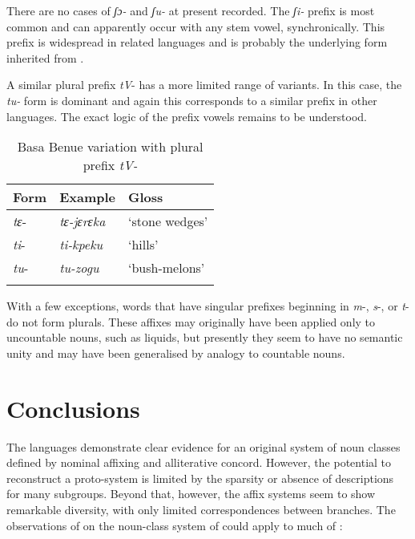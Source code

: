 \documentclass[output=paper]{langsci/langscibook}
\begin{document}
There are no cases of \textit{ʃɔ-} and \textit{ʃu-} at present recorded. The \textit{ʃi-} prefix is most common and can apparently occur with any stem vowel, synchronically. This prefix is widespread in related languages and is probably the underlying form inherited from . 

A similar plural prefix \textit{tV}- has a more limited range of variants. In this case, the \textit{tu-} form is dominant and again this corresponds to a similar prefix in other languages. The exact logic of the prefix vowels remains to be understood.

\begin{table}
\label{extab:kainji:8}
 \caption{Basa Benue variation with plural prefix \textit{tV-}}
 \begin{tabularx}{\textwidth}{XXX}
  \lsptoprule
{Form} & {Example}  & {Gloss}\\
\midrule
\textit{tɛ}-   &  \textit{tɛ-jɛrɛka}  & `stone wedges'\\
\textit{ti}-  &   \textit{ti-kpeku}  & `hills'\\
\textit{tu}-  &   \textit{tu-zogu}  & `bush-melons'\\
\lspbottomrule
 \end{tabularx}
\end{table}


With a few exceptions, words that have singular prefixes beginning in \textit{m}-, \textit{s}-, or \textit{t}- do not form plurals. These affixes may originally have been applied only to uncountable nouns, such as liquids, but presently they seem to have no semantic unity and may have been generalised by analogy to countable nouns. 

\section{Conclusions}

The  languages demonstrate clear evidence for an original system of noun classes defined by nominal affixing and alliterative concord. However, the potential to reconstruct a proto-system is limited by the sparsity or absence of descriptions for many subgroups. Beyond that, however, the affix systems seem to show remarkable diversity, with only limited correspondences between branches. The observations of \citet{McGill2009} on the noun-class system of  could apply to much of :
\end{document}
